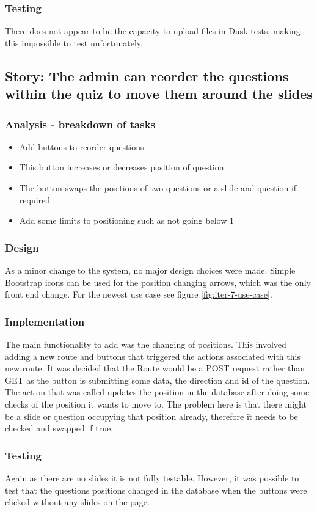 \subsubsection{Testing}
There does not appear to be the capacity to upload files in Dusk tests, making this impossible to test unfortunately.
\newpage

\subsection{Story: The admin can reorder the questions within the quiz to move them around the slides}
\subsubsection{Analysis - breakdown of tasks}
\begin{itemize}
	\item Add buttons to reorder questions
	\item This button increases or decreases position of question
	\item The button swaps the positions of two questions or a slide and question if required
	\item Add some limits to positioning such as not going below 1
\end{itemize}
\subsubsection{Design}
As a minor change to the system, no major design choices were made. Simple Bootstrap icons can be used for the position changing arrows, which was the only front end change.
For the newest use case see figure \ref{fig:iter-7-use-case}.
\subsubsection{Implementation}
The main functionality to add was the changing of positions. This involved adding a new route and buttons that triggered the actions associated with this new route. It was decided that the Route would be a POST request rather than GET as the button is submitting some data, the direction and id of the question. The action that was called updates the position in the database after doing some checks of the position it wants to move to. The problem here is that there might be a slide or question occupying that position already, therefore it needs to be checked and swapped if true.
\subsubsection{Testing}
Again as there are no slides it is not fully testable. However, it was possible to test that the questions positions changed in the database when the buttons were clicked without any slides on the page.
\newpage

